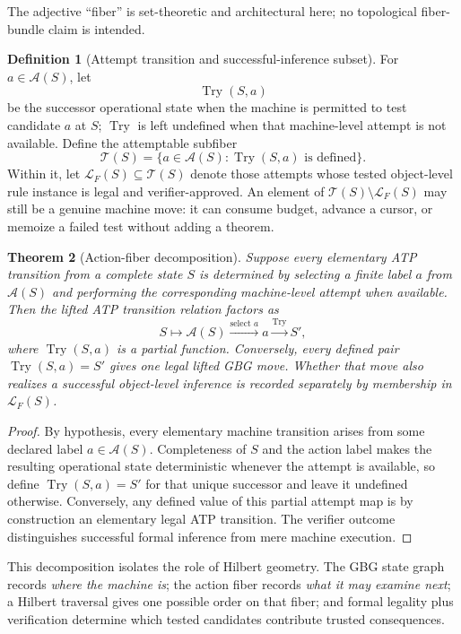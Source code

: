 \documentclass[11pt]{article}
\newtheorem{theorem}{Theorem}[section]
\theoremstyle{definition}
\newtheorem{definition}[theorem]{Definition}
\newcommand{\Try}{\operatorname{Try}}
\begin{document}
The adjective ``fiber'' is set-theoretic and architectural here; no topological fiber-bundle claim is intended.

\begin{definition}[Attempt transition and successful-inference subset]\label{def:try}
For $a\in\mathcal A(S)$, let
\[
\Try(S,a)
\]
be the successor operational state when the machine is permitted to test candidate $a$ at $S$; $\Try$ is left undefined when that machine-level attempt is not available. Define the attemptable subfiber
\[
\mathcal T(S)=\{a\in\mathcal A(S):\Try(S,a)\text{ is defined}\}.
\]
Within it, let $\mathcal L_F(S)\subseteq\mathcal T(S)$ denote those attempts whose tested object-level rule instance is legal and verifier-approved. An element of $\mathcal T(S)\setminus\mathcal L_F(S)$ may still be a genuine machine move: it can consume budget, advance a cursor, or memoize a failed test without adding a theorem.
\end{definition}

\begin{theorem}[Action-fiber decomposition]\label{thm:action-fiber}
Suppose every elementary ATP transition from a complete state $S$ is determined by selecting a finite label $a$ from $\mathcal A(S)$ and performing the corresponding machine-level attempt when available. Then the lifted ATP transition relation factors as
\[
S
\longmapsto
\mathcal A(S)
\xrightarrow{\text{select }a}
a
\xrightarrow{\Try}
S',
\]
where $\Try(S,a)$ is a partial function. Conversely, every defined pair $\Try(S,a)=S'$ gives one legal lifted GBG move. Whether that move also realizes a successful object-level inference is recorded separately by membership in $\mathcal L_F(S)$.
\end{theorem}

\begin{proof}
By hypothesis, every elementary machine transition arises from some declared label $a\in\mathcal A(S)$. Completeness of $S$ and the action label makes the resulting operational state deterministic whenever the attempt is available, so define $\Try(S,a)=S'$ for that unique successor and leave it undefined otherwise. Conversely, any defined value of this partial attempt map is by construction an elementary legal ATP transition. The verifier outcome distinguishes successful formal inference from mere machine execution.
\end{proof}

This decomposition isolates the role of Hilbert geometry. The GBG state graph records \emph{where the machine is}; the action fiber records \emph{what it may examine next}; a Hilbert traversal gives one possible order on that fiber; and formal legality plus verification determine which tested candidates contribute trusted consequences.
\end{document}
